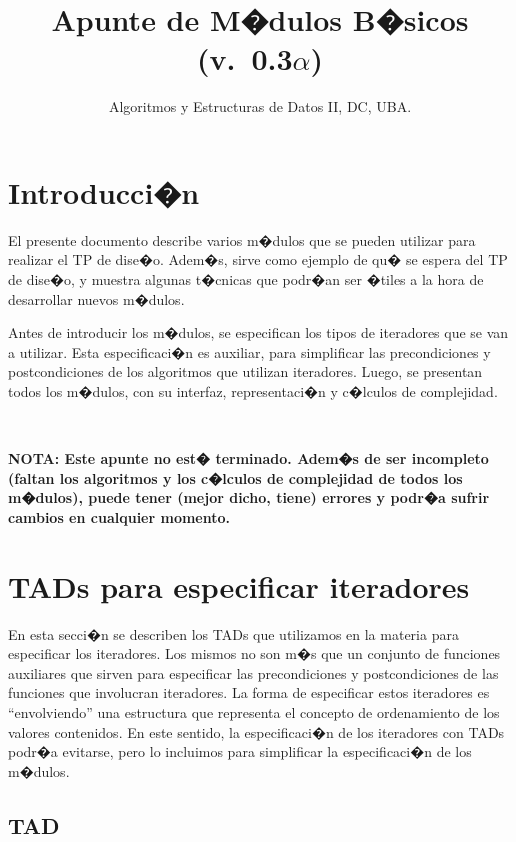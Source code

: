 \documentclass[a4paper,10pt]{article}
\title{Apunte de M�dulos B�sicos (v.\ 0.3$\alpha$)}
\author{Algoritmos y Estructuras de Datos II, DC, UBA.}
\date{\Cuatrimestre}
\begin{document}
\thispagestyle{empty}
\maketitle
\tableofcontents

\newpage

\section{Introducci�n}

El presente documento describe varios m�dulos que se pueden utilizar para realizar el TP de dise�o.  Adem�s, sirve como ejemplo de qu� se espera del TP de dise�o, y muestra algunas t�cnicas que podr�an ser �tiles a la hora de desarrollar nuevos m�dulos.

Antes de introducir los m�dulos, se especifican los tipos de iteradores que se van a utilizar.  Esta especificaci�n es auxiliar, para simplificar las precondiciones y postcondiciones de los algoritmos que utilizan iteradores.  Luego, se presentan todos los m�dulos, con su interfaz, representaci�n y c�lculos de complejidad.

~

\noindent\textbf{NOTA: Este apunte no est� terminado.  Adem�s de ser incompleto (faltan los algoritmos y los c�lculos de complejidad de todos los m�dulos), puede tener (mejor dicho, tiene) errores y podr�a sufrir cambios en cualquier momento.}

\section{TADs para especificar iteradores}

En esta secci�n se describen los TADs que utilizamos en la materia para especificar los iteradores.  Los mismos no son m�s que un conjunto de funciones auxiliares que sirven para especificar las precondiciones y postcondiciones de las funciones que involucran iteradores.  La forma de especificar estos iteradores es ``envolviendo'' una estructura que representa el concepto de ordenamiento de los valores contenidos.  En este sentido, la especificaci�n de los iteradores con TADs podr�a evitarse, pero lo incluimos para simplificar la especificaci�n de los m�dulos. 

\subsection{TAD }
\end{document}
